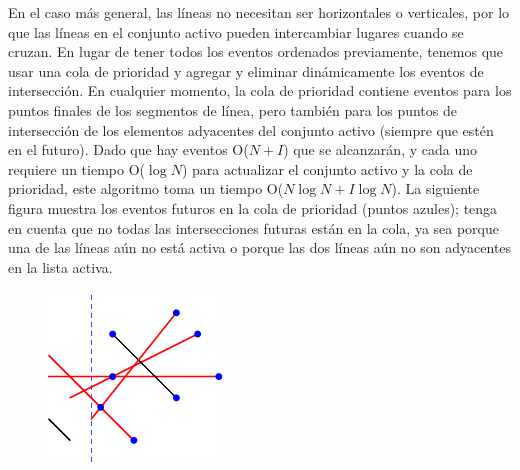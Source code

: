 En el caso más general, las líneas no necesitan ser horizontales o verticales, por lo que las líneas en el conjunto activo pueden intercambiar lugares cuando se cruzan. En lugar de tener todos los eventos ordenados previamente, tenemos que usar una cola de prioridad y agregar y eliminar dinámicamente los eventos de intersección. En cualquier momento, la cola de prioridad contiene eventos para los puntos finales de los segmentos de línea, pero también para los puntos de intersección de los elementos adyacentes del conjunto activo (siempre que estén en el futuro). Dado que hay eventos O($N + I$) que se alcanzarán, y cada uno requiere un tiempo O($\log N$) para actualizar el conjunto activo y la cola de prioridad, este algoritmo toma un tiempo O($N \log N + I \log N$). La siguiente figura muestra los eventos futuros en la cola de prioridad (puntos azules); tenga en cuenta que no todas las intersecciones futuras están en la cola, ya sea porque una de las líneas aún no está activa o porque las dos líneas aún no son adyacentes en la lista activa.

\begin{figure}[h!]
	\centering
	\includegraphics[width=0.2\linewidth]{img/lines}
	\label{fig:lines}
\end{figure}
